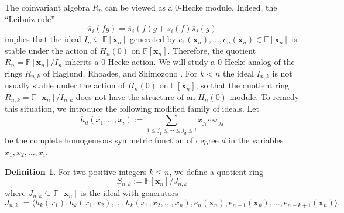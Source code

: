 \documentclass[10pt]{amsart}
\theoremstyle{definition}
\newtheorem{defn}[theorem]{Definition}
\newcommand{\FF}{{\mathbb{F}}}
\newcommand{\xx}{{\mathbf {x}}}
\newcommand{\pib}{\overline{\pi}}
\begin{document}
The coinvariant algebra $R_n$ can be viewed as a 0-Hecke module.
Indeed, 
the ``Leibniz rule''
\begin{equation}
\label{leibniz}
\pib_i(fg) = \pib_i(f) g + s_i(f) \pib_i(g)
\end{equation}
implies that the ideal 
$I_n \subseteq \FF[\xx_n]$ generated by $e_1(\xx_n), \dots, e_n(\xx_n) \in \FF[\xx_n]$ 
is stable under the action of $H_n(0)$ on $\FF[\xx_n]$.  Therefore,
 the quotient $R_n = {\FF[\xx_n]} / {I_n}$ inherits a 0-Hecke action.
We will study a 0-Hecke analog of the rings $R_{n,k}$ of Haglund, Rhoades, and Shimozono \cite{HRS}.
For $k < n$ the ideal $I_{n,k}$ is not usually stable under the action of $H_n(0)$ on 
$\FF[\xx_n]$, so that the quotient ring $R_{n,k} = {\FF[\xx_n]} / {I_{n,k}}$ does not have the structure of 
an $H_n(0)$-module.  To remedy this situation, we introduce the following modified family of ideals.
Let 
\begin{equation}
h_d(x_1, \dots, x_i) := \sum_{1 \leq j_1 \leq \cdots \leq j_d \leq i} x_{j_1} \cdots x_{j_d} 
\end{equation}
be the complete homogeneous symmetric function of degree $d$ in the variables $x_1, x_2, \dots, x_i$.

\begin{defn}
For two positive integers $k \leq n$, we define a quotient ring 
\begin{equation*}
S_{n,k} := {\FF[\xx_n]} / {J_{n,k}}
\end{equation*}
where $J_{n,k} \subseteq \FF[\xx_n]$ is the ideal with generators
\begin{equation*}
J_{n,k} := \langle h_k(x_1), h_k(x_1, x_2), \dots, h_k(x_1, x_2, \dots, x_n), e_n(\xx_n), e_{n-1}(\xx_n), \dots, e_{n-k+1}(\xx_n) 
\rangle.
\end{equation*}
\end{defn}
\end{document}
